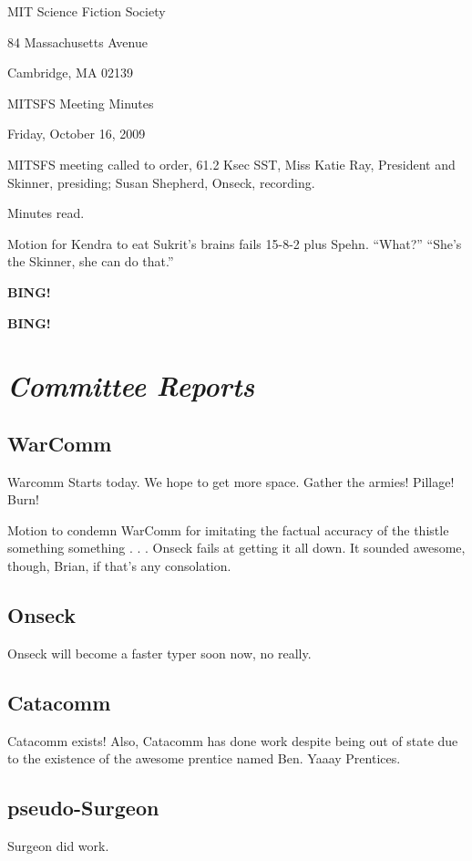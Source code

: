\documentclass[10pt]{article}
\newcommand{\bing}{{\bf BING!} }
\newcommand{\goto}[1]{\bing \vskip 12pt \section*{{\em{#1}}}}
\newcommand{\ps}{ plus Spehn\xspace}
\begin{document}
\begin{center}

MIT Science Fiction Society

84 Massachusetts Avenue

Cambridge, MA 02139

\vspace{12pt}

MITSFS Meeting Minutes

Friday, October 16, 2009

\end{center}

\vspace{18pt}

\setlength{\parskip}{6pt}

\noindent
MITSFS meeting called to order, 61.2 Ksec SST,
Miss Katie Ray, President and Skinner, presiding; Susan Shepherd, Onseck, recording.

Minutes read.

Motion for Kendra to eat Sukrit's brains fails 15-8-2 \ps. ``What?'' ``She's the Skinner, she can do that.''

\bing

\goto{Committee Reports}

\subsection*{WarComm}
Warcomm Starts today. We hope to get more space. Gather the armies! Pillage! Burn!

Motion to condemn WarComm for imitating the factual accuracy of the thistle something something . . . Onseck fails at getting it all down. It sounded awesome, though, Brian, if that's any consolation.

\subsection*{Onseck}
Onseck will become a faster typer soon now, no really.

\subsection*{Catacomm}
Catacomm exists! Also, Catacomm has done work despite being out of state due to the existence of the awesome prentice named Ben. Yaaay Prentices.

\subsection*{pseudo-Surgeon}
Surgeon did work.
\end{document}
